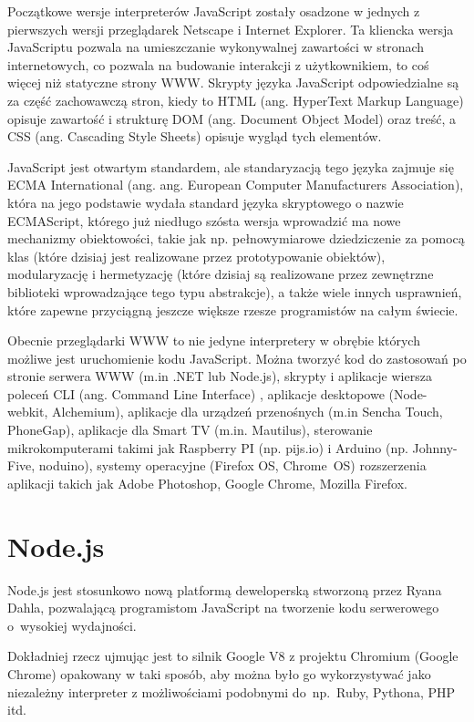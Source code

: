 \documentclass[twoside,a4paper,openright,12pt]{book}
\begin{document}
Początkowe wersje interpreterów JavaScript zostały osadzone w jednych z pierwszych wersji przeglądarek Netscape i Internet Explorer. Ta kliencka wersja JavaScriptu pozwala na umieszczanie wykonywalnej zawartości w stronach internetowych, co pozwala na budowanie interakcji z użytkownikiem, to coś więcej niż statyczne strony WWW. Skrypty języka JavaScript odpowiedzialne są za część zachowawczą stron, kiedy to HTML (ang. HyperText Markup Language) opisuje zawartość i strukturę DOM (ang. Document Object Model) oraz treść, a CSS (ang. Cascading Style Sheets) opisuje wygląd tych elementów.

JavaScript jest otwartym standardem, ale standaryzacją tego języka zajmuje się ECMA International (ang. ang. European Computer Manufacturers Association), która na jego podstawie wydała standard języka skryptowego o nazwie ECMAScript, którego już niedługo szósta wersja wprowadzić ma nowe mechanizmy obiektowości, takie jak np. pełnowymiarowe dziedziczenie za pomocą klas (które dzisiaj jest realizowane przez prototypowanie obiektów), modularyzację i hermetyzację (które dzisiaj są realizowane przez zewnętrzne biblioteki wprowadzające tego typu abstrakcje), a także wiele innych usprawnień, które zapewne przyciągną jeszcze większe rzesze programistów na całym świecie.

Obecnie przeglądarki WWW to nie jedyne interpretery w obrębie których możliwe jest uruchomienie kodu JavaScript. Można tworzyć kod do zastosowań po stronie serwera WWW (m.in .NET lub Node.js), skrypty i aplikacje wiersza poleceń CLI (ang. Command Line Interface) \cite{stefanov2012javascript}, aplikacje desktopowe (Node-webkit, Alchemium), aplikacje dla urządzeń przenośnych (m.in Sencha Touch, PhoneGap), aplikacje dla Smart TV (m.in. Mautilus), sterowanie mikrokomputerami takimi jak Raspberry PI (np. pijs.io) i Arduino (np. Johnny-Five, noduino), systemy operacyjne (Firefox OS, Chrome~OS) rozszerzenia aplikacji takich jak Adobe Photoshop, Google Chrome, Mozilla Firefox.


\section{Node.js}

Node.js jest stosunkowo nową platformą deweloperską stworzoną przez Ryana Dahla, pozwalającą programistom JavaScript na tworzenie kodu serwerowego o~wysokiej wydajności. \cite{means2012node} \cite{powers2012learning}

Dokładniej rzecz ujmując jest to silnik Google V8 z projektu Chromium (Google Chrome) opakowany w taki sposób, aby można było go wykorzystywać jako niezależny interpreter z możliwościami podobnymi do~np.~Ruby, Pythona, PHP itd.
\end{document}
